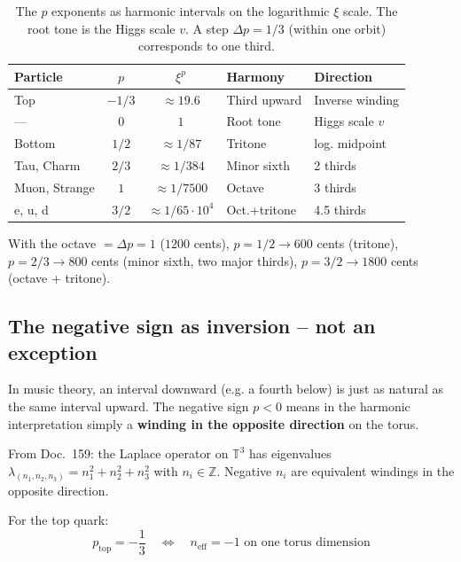 \begin{table}[htbp]
\centering\small
\begin{tabular}{lccll}
\toprule
\textbf{Particle} & $p$ & \textbf{$\xi^p$} & \textbf{Harmony} & \textbf{Direction} \\
\midrule
Top          & $-1/3$ & ${\approx}19.6$        & Third upward  & Inverse winding \\
---          & $0$    & $1$                    & Root tone     & Higgs scale $v$ \\
Bottom       & $1/2$  & ${\approx}1/87$        & Tritone       & log. midpoint \\
Tau, Charm   & $2/3$  & ${\approx}1/384$       & Minor sixth   & 2 thirds \\
Muon, Strange & $1$   & ${\approx}1/7500$      & Octave        & 3 thirds \\
e, u, d      & $3/2$  & ${\approx}1/65{\cdot}10^4$ & Oct.+tritone & 4.5 thirds \\
\bottomrule
\end{tabular}
\caption{The $p$ exponents as harmonic intervals on the logarithmic
$\xi$ scale. The root tone is the Higgs scale $v$.
A step $\Delta p = 1/3$ (within one orbit) corresponds to one third.}
\label{tab:harmonic}
\end{table}
\noindent With the octave $= \Delta p = 1$ ($1200$ cents), $p = 1/2 \to 600$ cents (tritone), $p = 2/3 \to 800$ cents (minor sixth, two major thirds), $p = 3/2 \to 1800$ cents (octave + tritone).

\subsection{The negative sign as inversion -- not an exception}

In music theory, an interval downward (e.g. a fourth below) is just as
natural as the same interval upward. The negative sign $p < 0$ means
in the harmonic interpretation simply a \textbf{winding in the opposite
direction} on the torus.

From Doc.~159: the Laplace operator on $\mathbb{T}^3$ has eigenvalues
$\lambda_{(n_1,n_2,n_3)} = n_1^2 + n_2^2 + n_3^2$ with
$n_i \in \mathbb{Z}$. Negative $n_i$ are equivalent windings in the
opposite direction.

For the top quark:
\begin{equation}
    p_{\text{top}} = -\frac{1}{3}
    \quad \Longleftrightarrow \quad
    n_{\text{eff}} = -1 \text{ on one torus dimension}
\end{equation}

